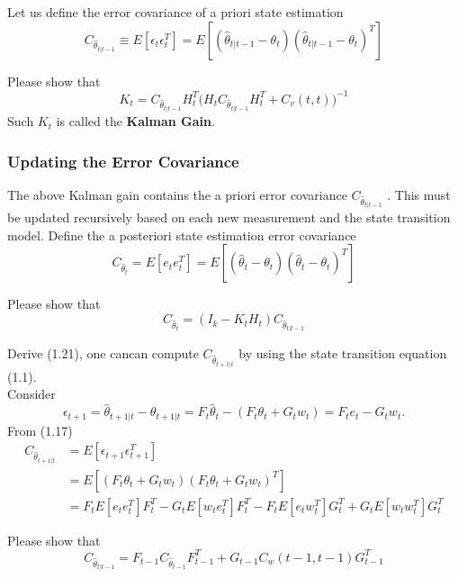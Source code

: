 \documentclass[a4 paper]{article}
\begin{document}
Let us define the error covariance of a priori state estimation
\begin{equation}
    C_{\hat{\theta}_{t|t-1}}\equiv E[\epsilon_t\epsilon_t^T]=E[(\hat{\theta}_{t|t-1}-\theta_t)(\hat{\theta}_{t|t-1}-\theta_t)^T]
\end{equation}
\begin{tcolorbox}[colback=RubineRed!5!white,colframe=RubineRed!75!black]
Please show that 
\begin{equation}
    K_t=C_{\hat{\theta}_{t|t-1}}H_t^T\Big(H_tC_{\hat{\theta}_{t|t-1}}H_t^T+C_v(t,t)\Big)^{-1}
\end{equation}
Such $K_t$ is called the \textbf{Kalman Gain}. 
\end{tcolorbox}
\subsubsection{Updating the Error Covariance } 
The above Kalman gain contains the a priori error covariance $C_{\hat{\theta}_{t|t-1}}$ . This must be updated recursively based on each new measurement and the state transition model. 
Define the a posteriori state estimation error covariance
\begin{equation}
    C_{\hat{\theta}_{t}}=E[e_{t}e_t^T]=E[(\hat{\theta}_{t}-\theta_t)(\hat{\theta}_{t}-\theta_t)^T]
\end{equation}
\begin{tcolorbox}[colback=RubineRed!5!white,colframe=RubineRed!75!black]
Please show that 
\begin{equation}
    C_{\hat{\theta}_{t}}=(I_k-K_tH_t)C_{\hat{\theta}_{t|t-1}}
\end{equation}
\end{tcolorbox}
Derive (1.21), one cancan compute $C_{\hat{\theta}_{t+1|t}}$ by using the state transition equation (1.1).\\
Consider
\begin{equation}
\epsilon_{t+1}=\hat{\theta}_{t+1|t}-\theta_{t+1|t}=F_t\hat{\theta}_t-(F_t\theta_t+G_t{w}_t)=F_{t}e_t-G_{t}w_t.
\end{equation}
From (1.17)
\begin{equation}
\begin{split}
    C_{\hat{\theta}_{t+1|t}}&=E[\epsilon_{t+1}\epsilon_{t+1}^T]\\
    &=E[(F_{t}\theta_t+G_tw_t)(F_{t}\theta_t+G_tw_t)^T]\\
    &=F_tE[e_te_t^T]F_t^T-G_tE[w_te_t^T]F_t^T-F_tE[e_tw_t^T]G_t^T+G_tE[w_tw_t^T]G_t^T
\end{split}
\end{equation}
\begin{tcolorbox}[colback=RubineRed!5!white,colframe=RubineRed!75!black]
Please show that 
\begin{equation}
     C_{\hat{\theta}_{t|t-1}}=F_{t-1} C_{\hat{\theta}_{t-1}}F_{t-1}^T+G_{t-1}C_{w}(t-1,t-1)G_{t-1}^T
\end{equation}
\end{tcolorbox}
\end{document}
